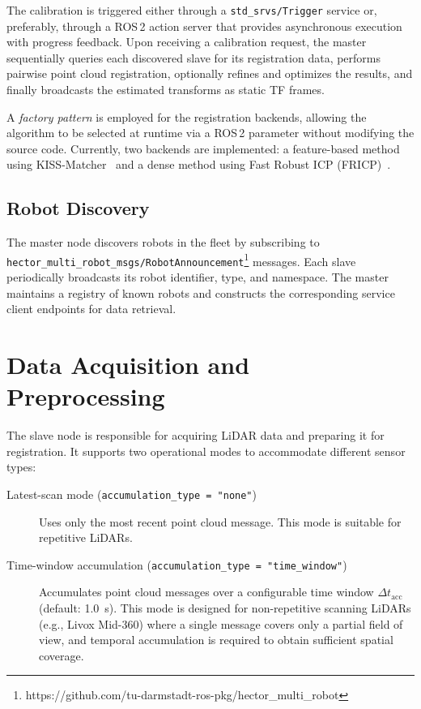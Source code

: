 The calibration is triggered either through a \texttt{std\_srvs/Trigger} service
or, preferably, through a ROS\,2 action server that provides asynchronous execution
with progress feedback.
Upon receiving a calibration request, the master sequentially queries each discovered
slave for its registration data, performs pairwise point cloud registration, optionally
refines and optimizes the results, and finally broadcasts the estimated transforms as
static TF frames.

A \emph{factory pattern} is employed for the registration backends, allowing the
algorithm to be selected at runtime via a ROS\,2 parameter without modifying the
source code.
Currently, two backends are implemented: a feature-based method using
KISS-Matcher~\cite{KISSMATCHER} and a dense method using
Fast Robust ICP (FRICP)~\cite{zhang_fast}.

\subsection{Robot Discovery}

The master node discovers robots in the fleet by subscribing to
\texttt{hector\_multi\_robot\_msgs/RobotAnnouncement}\footnote{https://github.com/tu-darmstadt-ros-pkg/hector_multi_robot} messages.
Each slave periodically broadcasts its robot identifier, type, and namespace.
The master maintains a registry of known robots and constructs the
corresponding service client endpoints for data retrieval.

\section{Data Acquisition and Preprocessing}
\label{sec:data_acquisition}

The slave node is responsible for acquiring LiDAR data and preparing it for
registration.
It supports two operational modes to accommodate different sensor types:

\begin{description}
    \item[Latest-scan mode (\texttt{accumulation\_type = "none"})]
        Uses only the most recent point cloud message.
        This mode is suitable for repetitive LiDARs.
    \item[Time-window accumulation (\texttt{accumulation\_type = "time\_window"})]
        Accumulates point cloud messages over a configurable time window
        $\Delta t_\mathrm{acc}$ (default: \SI{1.0}{\second}).
        This mode is designed for non-repetitive scanning LiDARs
        (e.g., Livox Mid-360) where a single message covers only a partial
        field of view, and temporal accumulation is required to obtain
        sufficient spatial coverage.
\end{description}

